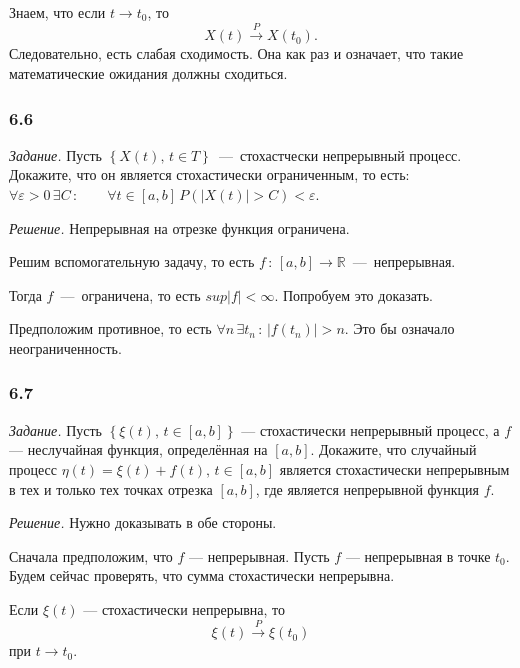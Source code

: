 Знаем, что если $t \to t_0$, то
$$X \left( t \right) \overset{P}{ \to }
  X \left( t_0 \right).$$
Следовательно, есть слабая сходимость.
Она как раз и означает, что такие математические ожидания должны сходиться.

\subsubsection*{6.6}

\textit{Задание.}
Пусть $ \left\{ X \left( t \right), \, t \in T \right\} $~---~стохастчески непрерывный процесс.
Докажите, что он является стохастически ограниченным, то есть:
$ \forall \varepsilon > 0 \, \exists C \, : \qquad \forall t \in \left[ a, b \right] \,
  P \left( \left| X \left( t \right) \right| > C \right) < \varepsilon $.

\textit{Решение.}
Непрерывная на отрезке функция ограничена.

Решим вспомогательную задачу,
то есть $f \, : \, \left[ a, b \right] \to \mathbb{R}$~---~непрерывная.

Тогда $f$~---~ограничена, то есть $sup \left| f \right| < \infty $.
Попробуем это доказать.

Предположим противное,
то есть $ \forall n \, \exists t_n \, : \, \left| f \left( t_n \right) \right| > n$.
Это бы означало неограниченность.

\subsubsection*{6.7}

\textit{Задание.}
Пусть $ \left\{ \xi \left( t \right), \, t \in \left[ a, b \right] \right\} $ ---
стохастически непрерывный процесс, а $f$ --- неслучайная функция,
определённая на $ \left[ a, b \right] $.
Докажите, что случайный процесс
$ \eta \left( t \right) =
  \xi \left( t \right) + f \left( t \right), \, t \in \left[ a, b \right] $
является стохастически непрерывным в тех и только тех точках отрезка $ \left[ a, b \right] $,
где является непрерывной функция $f$.

\textit{Решение.}
Нужно доказывать в обе стороны.

Сначала предположим, что $f$ --- непрерывная.
Пусть $f$ --- непрерывная в точке $t_0$.
Будем сейчас проверять, что сумма стохастически непрерывна.

Если $ \xi \left( t \right) $ --- стохастически непрерывна, то
$$ \xi \left( t \right) \overset{P}{ \to }
  \xi \left( t_0 \right)$$
при $t \to t_0$.


